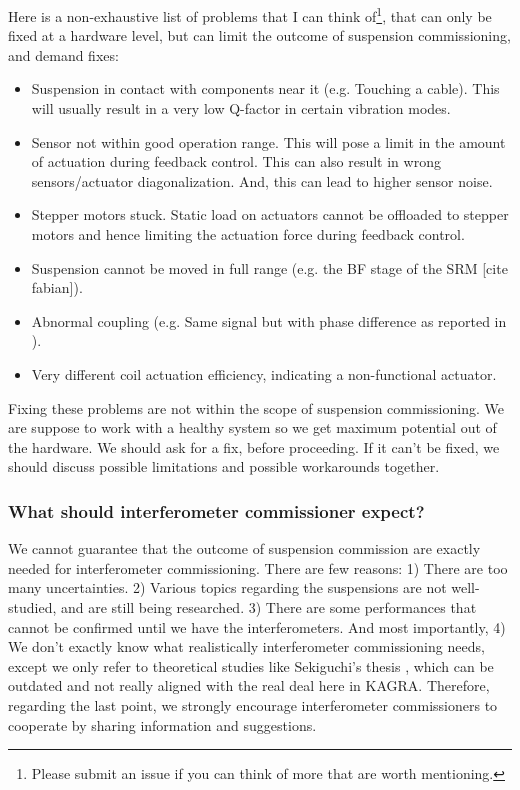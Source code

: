 Here is a non-exhaustive list of problems that I can think of\footnote{Please submit an issue if you can think of more that are worth mentioning.}, that can only be fixed at a hardware level, but can limit the outcome of suspension commissioning, and demand fixes:
\begin{itemize}
	\item Suspension in contact with components near it (e.g. Touching a cable). This will usually result in a very low Q-factor in certain vibration modes.
	\item Sensor not within good operation range. This will pose a limit in the amount of actuation during feedback control. This can also result in wrong sensors/actuator diagonalization. And, this can lead to higher sensor noise.
	\item Stepper motors stuck. Static load on actuators cannot be offloaded to stepper motors and hence limiting the actuation force during feedback control.
	\item Suspension cannot be moved in full range (e.g. the BF stage of the SRM [cite fabian]).
	\item Abnormal coupling (e.g. Same signal but with phase difference as reported in \cite{prequa}).
	\item Very different coil actuation efficiency, indicating a non-functional actuator.
\end{itemize}
Fixing these problems are not within the scope of suspension commissioning.
We are suppose to work with a healthy system so we get maximum potential out of the hardware.
We should ask for a fix, before proceeding.
If it can't be fixed, we should discuss possible limitations and possible workarounds together.

\subsubsection{What should interferometer commissioner expect?}
We cannot guarantee that the outcome of suspension commission are exactly needed for interferometer commissioning.
There are few reasons:
1) There are too many uncertainties.
2) Various topics regarding the suspensions are not well-studied, and are still being researched.
3) There are some performances that cannot be confirmed until we have the interferometers.
And most importantly, 4) We don't exactly know what realistically interferometer commissioning needs, except we only refer to theoretical studies like Sekiguchi's thesis \cite{Sekiguchi:2016bmv}, which can be outdated and not really aligned with the real deal here in KAGRA.
Therefore, regarding the last point, we strongly encourage interferometer commissioners to cooperate by sharing information and suggestions.

